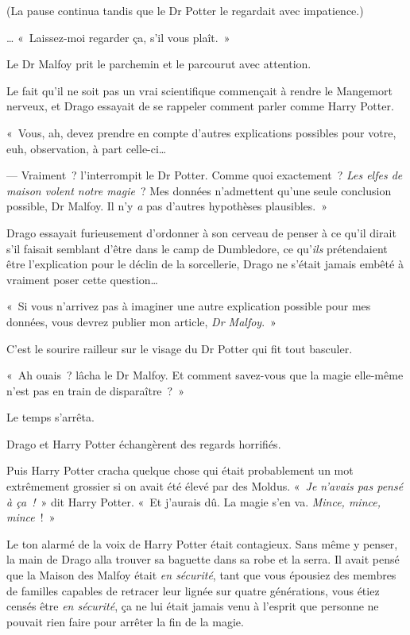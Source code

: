 (La pause continua tandis que le Dr Potter le regardait avec impatience.)

… «~Laissez-moi regarder ça, s'il vous plaît.~»

Le Dr Malfoy prit le parchemin et le parcourut avec attention.

Le fait qu'il ne soit pas un vrai scientifique commençait à rendre le Mangemort nerveux, et Drago essayait de se rappeler comment parler comme Harry Potter.

«~Vous, ah, devez prendre en compte d'autres explications possibles pour votre, euh, observation, à part celle-ci…

--- Vraiment~? l'interrompit le Dr Potter.
Comme quoi exactement~?
\emph{Les elfes de maison volent notre magie}~?
Mes données n'admettent qu'une seule conclusion possible, Dr Malfoy.
Il n'y \emph{a} pas d'autres hypothèses plausibles.~»

Drago essayait furieusement d'ordonner à son cerveau de penser à ce qu'il dirait s'il faisait semblant d'être dans le camp de Dumbledore, ce qu'\emph{ils} prétendaient être l'explication pour le déclin de la sorcellerie, Drago ne s'était jamais embêté à vraiment poser cette question…

«~Si vous n'arrivez pas à imaginer une autre explication possible pour mes données, vous devrez publier mon article, \emph{Dr Malfoy}.~»

C'est le sourire railleur sur le visage du Dr Potter qui fit tout basculer.

«~Ah ouais~? lâcha le Dr Malfoy.
Et comment savez-vous que la magie elle-même n'est pas en train de disparaître~?~»

Le temps s'arrêta.

Drago et Harry Potter échangèrent des regards horrifiés.

Puis Harry Potter cracha quelque chose qui était probablement un mot extrêmement grossier si on avait été élevé par des Moldus.
«~\emph{Je n'avais pas pensé à ça~!}~» dit Harry Potter.
«~Et j'aurais dû.
La magie s'en va.
\emph{Mince, mince, mince}~!~»

Le ton alarmé de la voix de Harry Potter était contagieux.
Sans même y penser, la main de Drago alla trouver sa baguette dans sa robe et la serra.
Il avait pensé que la Maison des Malfoy était \emph{en sécurité}, tant que vous épousiez des membres de familles capables de retracer leur lignée sur quatre générations, vous étiez censés être \emph{en sécurité}, ça ne lui était jamais venu à l'esprit que personne ne pouvait rien faire pour arrêter la fin de la magie.

